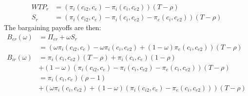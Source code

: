 \begin{align*}
WTP_r &= (\pi_{i}(c_{i2},c_{e})-\pi_{i}(c_{i},c_{e2})) \left( T- \rho \right) \\
S_r &= (\pi_{i}(c_{i2},c_{e})-\pi_{i}(c_{i},c_{e2})-\pi_{e}(c_{i},c_{e2})) \left( T - \rho \right)
\end{align*}
The bargaining payoffs are then:
\begin{align*}
B_{er}(\omega) &= \Pi_{er}+\omega S_r \\
&= \left(\omega\pi_{i}(c_{i2},c_{e})-\omega \pi_{i}(c_{i},c_{e2})+(1-\omega)\pi_{e}(c_{i},c_{e2}) \right) \left( T - \rho \right) \\
B_{ir}(\omega) &=\pi_{i}(c_i,c_{e2}) \left( T - \rho \right)
+\pi_i(c_i,c_e) (1-\rho)
\\ &+(1-\omega)(\pi_{i}(c_{i2},c_{e})-\pi_{i}(c_{i},c_{e2})-\pi_{e}(c_{i},c_{e2})) \left( T- \rho \right) \\
&=\pi_i(c_i,c_e) (\rho-1)
\\ &+(\omega \pi_i(c_i,c_{e2})+(1-\omega)(\pi_{i}(c_{i2},c_{e})-\pi_{e}(c_{i},c_{e2}))) \left( T - \rho \right)
\end{align*}


